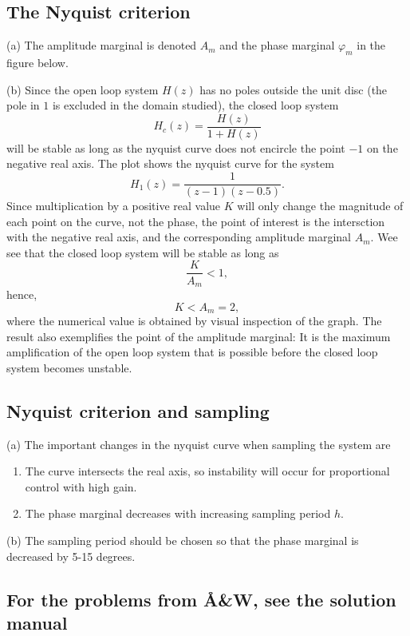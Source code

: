 \documentclass{scrartcl}
\begin{document}
\subsection*{The Nyquist criterion}
\label{sec-6-1}

   (a) The amplitude marginal is denoted $A_m$ and the phase marginal $\varphi_m$ in the figure below.
   \begin{center}
   
   \end{center}
   
   (b) Since the open loop system $H(z)$ has no poles outside the unit disc (the pole in $1$ is excluded in the domain studied), the closed loop system \[H_c(z) = \frac{H(z)}{1+H(z)} \] will be stable as long as the nyquist curve does not encircle the point $-1$ on the negative real axis. The plot shows the nyquist curve for the system \[H_1(z) = \frac{1}{(z-1)(z-0.5)}.\] Since multiplication by a positive real value $K$ will only change the magnitude of each point on the curve, not the phase, the point of interest is the intersction with the negative real axis, and the corresponding amplitude marginal $A_m$. Wee see that the closed loop system will be stable as long as 
   \[\frac{K}{A_m} < 1, \] hence,
   \[K < A_m = 2, \]
   where the numerical value is obtained by visual inspection of the graph. The result also exemplifies the point of the amplitude marginal: It is the maximum amplification of the open loop system that is possible before the closed loop system becomes unstable.   
\subsection*{Nyquist criterion and sampling}
\label{sec-6-2}

   (a) The important changes in the nyquist curve when sampling the system are 
\begin{enumerate}
\item The curve intersects the real axis, so instability will occur for proportional control with high gain.
\item The phase marginal decreases with increasing sampling period $h$.
\end{enumerate}

   (b) The sampling period should be chosen so that the phase marginal is decreased by 5-15 degrees. 
\subsection*{For the problems from Å\&W, see the solution manual}
\label{sec-6-3}


   
\end{document}
